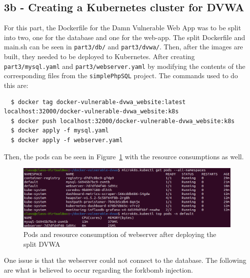 \documentclass[11pt]{article}
\begin{document}
\subsection*{3b - Creating a Kubernetes cluster for DVWA}
For this part, the Dockerfile for the Damn Vulnerable Web App was to be split into two, one for the
database and one for the web-app. The split Dockerfile and main.sh can be seen in \verb|part3/db/|
and \verb|part3/dvwa/|. Then, after the images are built, they needed to be deployed to Kubernetes.
After creating \verb|part3/mysql.yaml| and \verb|part3/webserver.yaml| by modifying the contents of
the corresponding files from the \verb|simplePhpSQL| project. The commands used to do this are:
\begin{verbatim}
  $ docker tag docker-vulnerable-dvwa_website:latest localhost:32000/docker-vulnerable-dvwa_website:k8s
  $ docker push localhost:32000/docker-vulnerable-dvwa_website:k8s
  $ docker apply -f mysql.yaml
  $ docker apply -f webserver.yaml
\end{verbatim}
Then, the pods can be seen in Figure~\ref{fig:split} with the resource consumptions as well.
\begin{figure}[htbp]
  \centering
  \includegraphics[width=1\linewidth]{./split_deploy.png}
  \caption{\label{fig:split}
  Pods and resource consumption of webserver after deploying the split DVWA}
\end{figure}
One issue is that the webserver could not connect to the database. The following are what
is believed to occur regarding the forkbomb injection.
\end{document}
